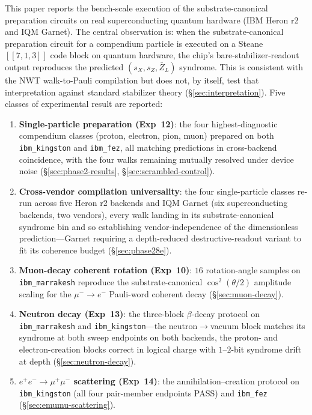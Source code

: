\documentclass[11pt]{article}
\newcommand{\Klogical}{[[7, 1, 3]]}
\newcommand{\barZ}{\bar Z_L}
\begin{document}
This paper reports the bench-scale execution of the substrate-canonical preparation circuits on real superconducting quantum hardware (IBM Heron r2 and IQM Garnet).  The central observation is: when the substrate-canonical preparation circuit for a compendium particle is executed on a Steane $\Klogical$ code block on quantum hardware, the chip's bare-stabilizer-readout output reproduces the predicted $(s_X, s_Z, \barZ)$ syndrome.  This is consistent with the NWT walk-to-Pauli compilation but does not, by itself, test that interpretation against standard stabilizer theory (\S\ref{sec:interpretation}).  Five classes of experimental result are reported:

\begin{enumerate}
\item \textbf{Single-particle preparation (Exp~12)}: the four highest-diagnostic compendium classes (proton, electron, pion, muon) prepared on both \texttt{ibm\_kingston} and \texttt{ibm\_fez}, all matching predictions in cross-backend coincidence, with the four walks remaining mutually resolved under device noise (\S\ref{sec:phase2-results}, \S\ref{sec:scrambled-control}).
\item \textbf{Cross-vendor compilation universality}: the four single-particle classes re-run across five Heron r2 backends and IQM Garnet (six superconducting backends, two vendors), every walk landing in its substrate-canonical syndrome bin and so establishing vendor-independence of the dimensionless prediction---Garnet requiring a depth-reduced destructive-readout variant to fit its coherence budget (\S\ref{sec:phase28e}).
\item \textbf{Muon-decay coherent rotation (Exp~10)}: $16$ rotation-angle samples on \texttt{ibm\_marrakesh} reproduce the substrate-canonical $\cos^2(\theta/2)$ amplitude scaling for the $\mu^- \to e^-$ Pauli-word coherent decay (\S\ref{sec:muon-decay}).
\item \textbf{Neutron decay (Exp~13)}: the three-block $\beta$-decay protocol on \texttt{ibm\_marrakesh} and \texttt{ibm\_kingston}---the neutron$\to$vacuum block matches its syndrome at both sweep endpoints on both backends, the proton- and electron-creation blocks correct in logical charge with $1$--$2$-bit syndrome drift at depth (\S\ref{sec:neutron-decay}).
\item \textbf{$e^+ e^- \to \mu^+ \mu^-$ scattering (Exp~14)}: the annihilation--creation protocol on \texttt{ibm\_kingston} (all four pair-member endpoints PASS) and \texttt{ibm\_fez} (\S\ref{sec:emumu-scattering}).
\end{enumerate}
\end{document}
